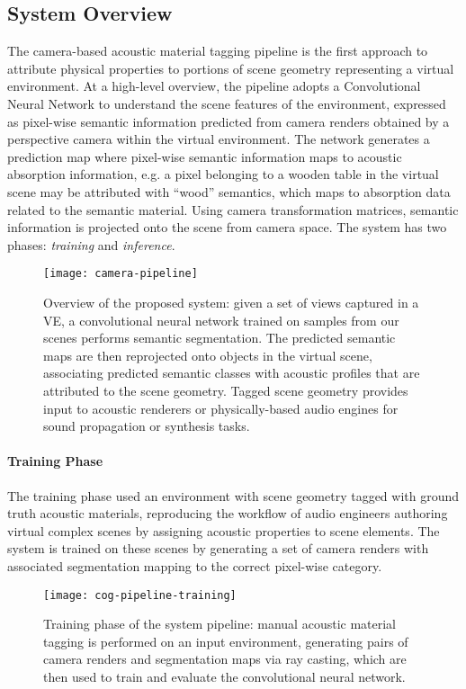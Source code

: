\subsection{System Overview}
The camera-based acoustic material tagging pipeline is the first approach to attribute physical properties to portions of scene geometry representing a virtual environment. At a high-level overview, the pipeline adopts a Convolutional Neural Network to understand the scene features of the environment, expressed as pixel-wise semantic information predicted from camera renders obtained by a perspective camera within the virtual environment. The network generates a prediction map where pixel-wise semantic information maps to acoustic absorption information, e.g. a pixel belonging to a wooden table in the virtual scene may be attributed with ``wood'' semantics, which maps to absorption data related to the semantic material. Using camera transformation matrices, semantic information is projected onto the scene from camera space. The system has two phases: \emph{training} and \emph{inference}.
\begin{figure}[htbp]
    \centering
    \texttt{[image: camera-pipeline]}
    \caption{Overview of the proposed system: given a set of views captured in a VE, a convolutional neural network trained on samples from our scenes performs semantic segmentation. The predicted semantic maps are then reprojected onto objects in the virtual scene, associating predicted semantic classes with acoustic profiles that are attributed to the scene geometry. Tagged scene geometry provides input to acoustic renderers or physically-based audio engines for sound propagation or synthesis tasks.}
    \label{fig:cog-pipeline}
\end{figure}

\paragraph{Training Phase}
The training phase used an environment with scene geometry tagged with ground truth acoustic materials, reproducing the workflow of audio engineers authoring virtual complex scenes by assigning acoustic properties to scene elements. The system is trained on these scenes by generating a set of camera renders with associated segmentation mapping to the correct pixel-wise category.
\begin{figure}[htbp]
    \centering
    \texttt{[image: cog-pipeline-training]}
    \caption{Training phase of the system pipeline: manual acoustic material tagging is performed on an input environment, generating pairs of camera renders and segmentation maps via ray casting, which are then used to train and evaluate the convolutional neural network.}
    \label{fig:cog-training}
\end{figure}

